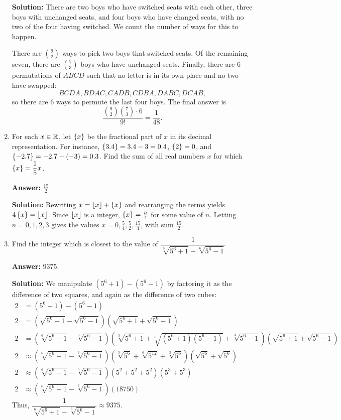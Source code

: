 \documentclass[11pt,paper=letter]{scrartcl}
\begin{document}
\begin{enumerate}[left=0pt]
\textbf{Solution:} There are two boys who have switched seats with each other, three boys with unchanged seats, and four boys who have changed seats, with no two of the four having switched. We count the number of ways for this to happen.

There are $\binom{9}{2}$ ways to pick two boys that switched seats. Of the remaining seven, there are $\binom{7}{3}$ boys who have unchanged seats. Finally, there are $6$ permutations of $ABCD$ such that no letter is in its own place and no two have swapped: $$BCDA, BDAC, CADB, CDBA, DABC, DCAB,$$ so there are $6$ ways to permute the last four boys. The final answer is $$\frac{\binom{9}{2}\binom{7}{3} \cdot 6}{9!} = \frac{1}{48}.$$

\item For each $x \in \mathbb R$, let $\left\{ x \right\}$ be the fractional part of $x$ in its decimal representation. For instance, $\left\{ 3.4 \right\} = 3.4 -3 = 0.4$, $\left\{ 2 \right\} = 0$, and $\left\{ -2.7 \right\} = -2.7 - (-3) = 0.3$. Find the sum of all real numbers $x$ for which $\left\{ x \right\} = \dfrac{1}{5}x$.

\textbf{Answer:} $\boxed{\frac{15}{2}}$.

\textbf{Solution:} Rewriting $x = \left\lfloor x \right\rfloor + \left\{ x \right\}$ and rearranging the terms yields $4\left\{ x \right\} = \left\lfloor x \right\rfloor$. Since $\left\lfloor x \right\rfloor$ is a integer, $\left\{ x \right\} = \frac{n}{4}$ for some value of $n$. Letting $n = 0, 1, 2, 3$ gives the values $x = 0, \frac{5}{4}, \frac{5}{2}, \frac{15}{4}$, with sum $\frac{15}{2}$.

\item Find the integer which is closest to the value of $\dfrac{1}{\sqrt[6]{5^6 + 1} - \sqrt[6]{5^6 - 1}}$

\textbf{Answer:} $\boxed{9375}$.

\textbf{Solution:} We manipulate $(5^6 + 1) - (5^6 - 1)$ by factoring it as the difference of two squares, and again as the difference of two cubes:
\begin{align*}
  2 &= (5^6 + 1) - (5^6 - 1) \\
  2 &= (\sqrt{5^6 + 1} - \sqrt{5^6 - 1})(\sqrt{5^6 + 1} + \sqrt{5^6 - 1}) \\
  2 &= (\sqrt[6]{5^6 + 1} - \sqrt[6]{5^6 - 1})(\sqrt[3]{5^6 + 1} + \sqrt[6]{(5^6 + 1)(5^6 - 1)} + \sqrt[3]{5^6 - 1})(\sqrt{5^6 + 1} + \sqrt{5^6 - 1}) \\
  2 &\approx (\sqrt[6]{5^6 + 1} - \sqrt[6]{5^6 - 1})(\sqrt[3]{5^6} + \sqrt[6]{5^{12}} + \sqrt[3]{5^6})(\sqrt{5^6} + \sqrt{5^6}) \\
  2 &\approx (\sqrt[6]{5^6 + 1} - \sqrt[6]{5^6 - 1})(5^2 + 5^2 + 5^2)(5^3 + 5^3) \\
  2 &\approx (\sqrt[6]{5^6 + 1} - \sqrt[6]{5^6 - 1})(18750)
\end{align*}
Thus, $\dfrac{1}{\sqrt[6]{5^6 + 1} - \sqrt[6]{5^6 - 1}} \approx 9375$.


\end{enumerate}
\end{document}
